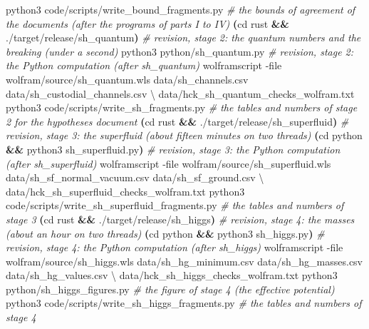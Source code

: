 \documentclass[
  10pt,
]{article}
\newenvironment{Shaded}{}{}
\newcommand{\AttributeTok}[1]{\textcolor[rgb]{0.49,0.56,0.16}{#1}}
\newcommand{\BuiltInTok}[1]{\textcolor[rgb]{0.00,0.50,0.00}{#1}}
\newcommand{\CommentTok}[1]{\textcolor[rgb]{0.38,0.63,0.69}{\textit{#1}}}
\newcommand{\DataTypeTok}[1]{\textcolor[rgb]{0.56,0.13,0.00}{#1}}
\newcommand{\ExtensionTok}[1]{#1}
\newcommand{\KeywordTok}[1]{\textcolor[rgb]{0.00,0.44,0.13}{\textbf{#1}}}
\newcommand{\NormalTok}[1]{#1}
\begin{document}
\begin{Shaded}
\begin{Highlighting}[]
\ExtensionTok{python3}\NormalTok{ code/scripts/write\_bound\_fragments.py }\CommentTok{\# the bounds of agreement of the documents (after the programs of parts I to IV)}
\KeywordTok{(}\BuiltInTok{cd}\NormalTok{ rust }\KeywordTok{\&\&} \ExtensionTok{./target/release/sh\_quantum}\KeywordTok{)}      \CommentTok{\# revision, stage 2: the quantum numbers and the breaking (under a second)}
\ExtensionTok{python3}\NormalTok{ python/sh\_quantum.py                  }\CommentTok{\# revision, stage 2: the Python computation (after sh\_quantum)}
\ExtensionTok{wolframscript} \AttributeTok{{-}file}\NormalTok{ wolfram/source/sh\_quantum.wls data/sh\_channels.csv data/sh\_custodial\_channels.csv }\DataTypeTok{\textbackslash{}}
\NormalTok{    data/hck\_sh\_quantum\_checks\_wolfram.txt}
\ExtensionTok{python3}\NormalTok{ code/scripts/write\_sh\_fragments.py    }\CommentTok{\# the tables and numbers of stage 2 for the hypotheses document}
\KeywordTok{(}\BuiltInTok{cd}\NormalTok{ rust }\KeywordTok{\&\&} \ExtensionTok{./target/release/sh\_superfluid}\KeywordTok{)}   \CommentTok{\# revision, stage 3: the superfluid (about fifteen minutes on two threads)}
\KeywordTok{(}\BuiltInTok{cd}\NormalTok{ python }\KeywordTok{\&\&} \ExtensionTok{python3}\NormalTok{ sh\_superfluid.py}\KeywordTok{)}       \CommentTok{\# revision, stage 3: the Python computation (after sh\_superfluid)}
\ExtensionTok{wolframscript} \AttributeTok{{-}file}\NormalTok{ wolfram/source/sh\_superfluid.wls data/sh\_sf\_normal\_vacuum.csv data/sh\_sf\_ground.csv }\DataTypeTok{\textbackslash{}}
\NormalTok{    data/hck\_sh\_superfluid\_checks\_wolfram.txt}
\ExtensionTok{python3}\NormalTok{ code/scripts/write\_sh\_superfluid\_fragments.py }\CommentTok{\# the tables and numbers of stage 3}
\KeywordTok{(}\BuiltInTok{cd}\NormalTok{ rust }\KeywordTok{\&\&} \ExtensionTok{./target/release/sh\_higgs}\KeywordTok{)}        \CommentTok{\# revision, stage 4: the masses (about an hour on two threads)}
\KeywordTok{(}\BuiltInTok{cd}\NormalTok{ python }\KeywordTok{\&\&} \ExtensionTok{python3}\NormalTok{ sh\_higgs.py}\KeywordTok{)}            \CommentTok{\# revision, stage 4: the Python computation (after sh\_higgs)}
\ExtensionTok{wolframscript} \AttributeTok{{-}file}\NormalTok{ wolfram/source/sh\_higgs.wls data/sh\_hg\_minimum.csv data/sh\_hg\_masses.csv data/sh\_hg\_values.csv }\DataTypeTok{\textbackslash{}}
\NormalTok{    data/hck\_sh\_higgs\_checks\_wolfram.txt}
\ExtensionTok{python3}\NormalTok{ python/sh\_higgs\_figures.py            }\CommentTok{\# the figure of stage 4 (the effective potential)}
\ExtensionTok{python3}\NormalTok{ code/scripts/write\_sh\_higgs\_fragments.py }\CommentTok{\# the tables and numbers of stage 4}

\end{Highlighting}
\end{Shaded}
\end{document}
